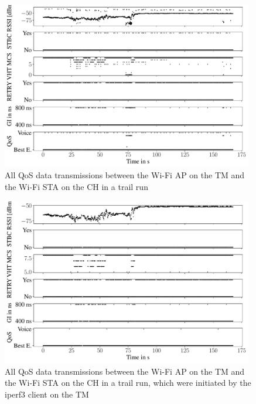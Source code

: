 \begin{figure}[H]%
	\centering
	\includegraphics[width=0.98\textwidth]{figures/wireless5}
	\caption{All QoS data transmissions between the Wi-Fi \acf{AP} on the \acf{TM} and the Wi-Fi \ac{STA} on the \acf{CH} in a trail run}
	\label{fig:trailrunAll}%
\end{figure}

\begin{figure}[H]%
	\centering
	\includegraphics[width=0.98\textwidth]{figures/wireless5_lan}
	\caption{All QoS data transmissions between the Wi-Fi \acf{AP} on the \acf{TM} and the Wi-Fi \ac{STA} on the \acf{CH} in a trail run,
	which were initiated by the iperf3 client on the \acf{TM}}
	\label{fig:trailrunIperf}%
\end{figure}

